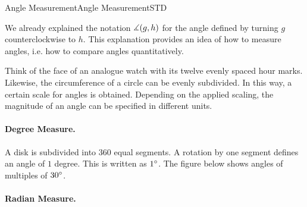 \begin{MXContent}{Angle Measurement}{Angle Measurement}{STD}

We already explained the notation $\measuredangle(g,h)$ for the angle defined by turning 
$g$ counterclockwise to $h$. This explanation provides an idea of how to measure angles, i.e.
how to compare angles quantitatively.

Think of the face of an analogue watch with its twelve evenly spaced hour marks. Likewise, 
the circumference of a circle can be evenly subdivided. In this way, a certain scale for 
angles is obtained. Depending on the applied scaling, the magnitude of an angle can be specified in 
different units. 

\paragraph{Degree Measure.}

A disk is subdivided into $360$ equal segments. A rotation by one segment defines an
angle of $1$ degree. This is written as $1^{\circ}$. The figure below shows angles 
of multiples of $30^{\circ}$.

\begin{center}
\end{center}

\paragraph{Radian Measure.}


\end{MXContent}
